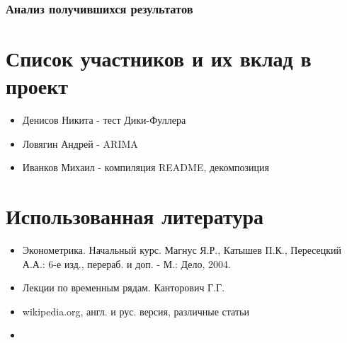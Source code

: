 \documentclass{article}
\begin{document}
    \subsubsection{Анализ получившихся результатов}

\newpage
  

\section{Список участников и их вклад в проект}

\begin{itemize}
    \item Денисов Никита - тест Дики-Фуллера
    \item Ловягин Андрей - ARIMA
    \item Иванков Михаил - компиляция README, декомпозиция
\end{itemize}{}

\section{Использованная литература}

\begin{itemize}
    \item Эконометрика. Начальный курс.  Магнус Я.Р., Катышев П.К., Пересецкий А.А.: 6-е изд., перераб. и доп. - М.: Дело, 2004.
    \item Лекции по временным рядам. Канторович Г.Г.
    \item wikipedia.org, англ. и рус. версия, различные статьи
    \item 
\end{itemize}
  
\end{document}
